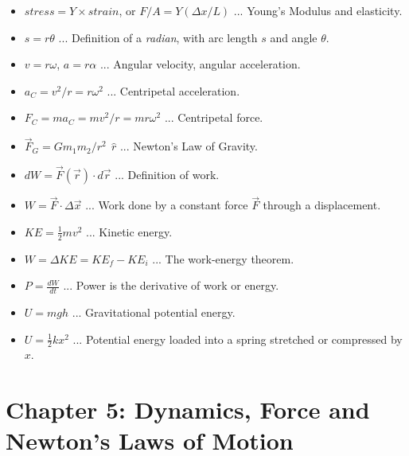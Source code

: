 \documentclass[10pt]{article}
\begin{document}
\begin{itemize}
\item $stress = Y \times strain$, or $F/A = Y (\Delta x / L)$ ... Young's Modulus and elasticity.
\item $s = r \theta$ ... Definition of a \textit{radian}, with arc length $s$ and angle $\theta$.
\item $v = r\omega$, $a = r\alpha$ ... Angular velocity, angular acceleration.
\item $a_C = v^2/r = r\omega^2$ ... Centripetal acceleration.
\item $F_C = m a_C = mv^2/r = mr\omega^2$ ... Centripetal force.
\item $\vec{F}_G = G m_1 m_2/r^2 ~~ \hat{r}$ ... Newton's Law of Gravity.
\item $dW = \vec{F}(\vec{r}) \cdot d\vec{r}$ ... Definition of work.
\item $W = \vec{F} \cdot \Delta \vec{x}$ ... Work done by a constant force $\vec{F}$ through a displacement.
\item $KE = \frac{1}{2}mv^2$ ... Kinetic energy.
\item $W = \Delta KE = KE_f - KE_i$ ... The work-energy theorem.
\item $P = \frac{dW}{dt}$ ... Power is the derivative of work or energy.
\item $U = mgh$ ... Gravitational potential energy.
\item $U = \frac{1}{2}kx^2$ ... Potential energy loaded into a spring stretched or compressed by $x$.
\end{itemize}

\section{Chapter 5: Dynamics, Force and Newton's Laws of Motion}
\end{document}
